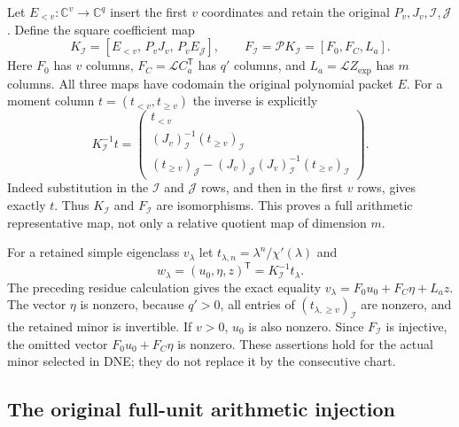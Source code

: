 \documentclass[11pt,a4paper]{article}
\begin{document}
Let $E_{<v}:\mathbb C^v\to\mathbb C^q$ insert the first $v$
coordinates and retain the original $P_v,J_v,\mathcal I,\mathcal J$.
Define the square coefficient map
\[
 K_{\mathcal I}=
 [E_{<v},\,P_vJ_v,\,P_vE_{\mathcal J}],\qquad
 F_{\mathcal I}=\mathscr P K_{\mathcal I}=[F_0,F_C,L_a].
 \tag{NCRP3}
\]
Here $F_0$ has $v$ columns, $F_C=\mathcal L C_a^{\mathsf T}$
has $q'$ columns, and $L_a=\mathcal L Z_{\exp}$ has $m$ columns.
All three maps have codomain the original polynomial packet $E$.
For a moment column $t=(t_{<v},t_{\ge v})$ the inverse is explicitly
\[
 K_{\mathcal I}^{-1}t=
 \begin{pmatrix}
 t_{<v}\\
 (J_v)_{\mathcal I}^{-1}(t_{\ge v})_{\mathcal I}\\
 (t_{\ge v})_{\mathcal J}
       -(J_v)_{\mathcal J}(J_v)_{\mathcal I}^{-1}
                                (t_{\ge v})_{\mathcal I}
 \end{pmatrix}.
 \tag{NCRP4}
\]
Indeed substitution in the $\mathcal I$ and $\mathcal J$ rows,
and then in the first $v$ rows, gives exactly $t$.
Thus $K_{\mathcal I}$ and $F_{\mathcal I}$ are isomorphisms.
This proves a full arithmetic representative map, not only a
relative quotient map of dimension $m$.

For a retained simple eigenclass $v_\lambda$ let
$t_{\lambda,n}=\lambda^n/\chi'(\lambda)$ and
\[
 w_\lambda=(u_0,\eta,z)^{\mathsf T}
                  =K_{\mathcal I}^{-1}t_\lambda .
 \tag{NCRP5}
\]
The preceding residue calculation gives the exact equality
$v_\lambda=F_0u_0+F_C\eta+L_az$.
The vector $\eta$ is nonzero, because $q'>0$, all entries of
$(t_{\lambda,\ge v})_{\mathcal I}$ are nonzero, and the retained
minor is invertible. If $v>0$, $u_0$ is also nonzero.
Since $F_{\mathcal I}$ is injective, the omitted vector
$F_0u_0+F_C\eta$ is nonzero. These assertions hold for the actual
minor selected in DNE; they do not replace it by the consecutive chart.

\subsection{The original full-unit arithmetic injection}
\end{document}
